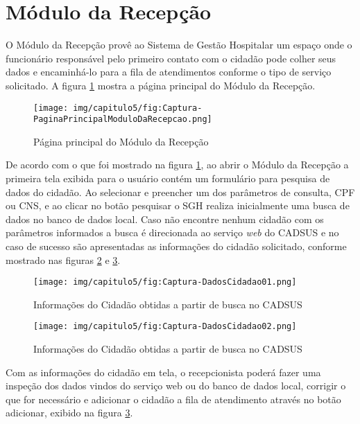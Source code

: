 \section{Módulo da Recepção}

O Módulo da Recepção provê ao Sistema de Gestão Hospitalar um espaço onde o funcionário responsável pelo primeiro contato com o cidadão pode colher seus dados e encaminhá-lo para a fila de atendimentos conforme o tipo de serviço solicitado. A figura \ref{fig:Captura-PaginaPrincipalModuloDaRecepcao} mostra a página principal do Módulo da Recepção.

\begin{figure}[H]
    \centering
     \caption{Página principal do Módulo da Recepção}
    \texttt{[image: img/capitulo5/fig:Captura-PaginaPrincipalModuloDaRecepcao.png]}
    \label{fig:Captura-PaginaPrincipalModuloDaRecepcao}
\end{figure}

De acordo com o que foi mostrado na figura \ref{fig:Captura-PaginaPrincipalModuloDaRecepcao}, ao abrir o Módulo da Recepção a primeira tela exibida para o usuário contém um formulário para pesquisa de dados do cidadão. Ao selecionar e preencher um dos parâmetros de consulta, CPF ou CNS, e ao clicar no botão pesquisar o SGH realiza inicialmente uma busca de dados no banco de dados local. Caso não encontre nenhum cidadão com os parâmetros informados a busca é direcionada ao serviço \textit{web} do CADSUS e no caso de sucesso são apresentadas as informações do cidadão solicitado, conforme mostrado nas figuras \ref{fig:Captura-DadosCidadao01} e \ref{fig:Captura-DadosCidadao02}.

\begin{figure}[H]
    \centering
     \caption{Informações do Cidadão obtidas a partir de busca no CADSUS}
    \texttt{[image: img/capitulo5/fig:Captura-DadosCidadao01.png]}
    \label{fig:Captura-DadosCidadao01}
\end{figure}

\begin{figure}[H]
    \centering
     \caption{Informações do Cidadão obtidas a partir de busca no CADSUS}
    \texttt{[image: img/capitulo5/fig:Captura-DadosCidadao02.png]}
    \label{fig:Captura-DadosCidadao02}
\end{figure}

Com as informações do cidadão em tela, o recepcionista poderá fazer uma inspeção dos dados vindos do serviço web ou do banco de dados local, corrigir o que for necessário e adicionar o cidadão a fila de atendimento através no botão adicionar, exibido na figura \ref{fig:Captura-DadosCidadao02}.

